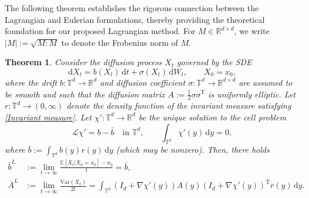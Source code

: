 \documentclass[12pt,a4paper,reqno]{amsart}
\newtheorem{theorem}{Theorem}[section]
\newcommand{\R}{\mathbb{R}}
\numberwithin{equation}{section}
\begin{document}
The following theorem establishes the rigorous connection between the Lagrangian and Eulerian formulations, thereby providing the theoretical foundation for our proposed Lagrangian method. For $M\in \R^{d\times d}$, we write $\lvert M \rvert := \sqrt{M:M}$ to denote the Frobenius norm of $M$.

 \begin{theorem}\label{Relation between Lagrangian and Eulerian frameworks}
 Consider the diffusion process $X_t$ governed by the SDE 
    \begin{equation}\label{target SDE}
        \mathrm{d}X_t = b(X_t)\,\mathrm{d}t + \sigma(X_t)\,\mathrm{d}W_t,\qquad X_0 = x_0,
\end{equation}
where the drift $b:\mathbb{T}^d\rightarrow \mathbb{R}^d$ and diffusion coefficient $\sigma:\mathbb{T}^d\rightarrow \mathbb{R}^{d \times d}$ are assumed to be smooth and such that the diffusion matrix $A := \frac{1}{2}\sigma\sigma^{\mathrm{T}}$ is uniformly elliptic. Let $r:\mathbb{T}^d\rightarrow (0,\infty)$ denote the density function of the invariant measure satisfying \eqref{Invariant measure}. Let $\chi' :\mathbb{T}^d \rightarrow \mathbb{R}^d$ be the unique solution to the cell problem
    \begin{equation}\label{chip eqn}
        \mathcal{L}\chi' = b - \bar{b}\quad\text{in }\mathbb{T}^d, \qquad \int_{\mathbb{T}^d}\chi'(y)\,\mathrm{d}y = 0,
    \end{equation}
    where $\bar{b}:=\int_{\mathbb{T}^d}b(y)r(y)\,\mathrm{d}y$ (which may be nonzero). Then, there holds
     \begin{align*}
 		\bar{b}^L &:=\lim_{t\to \infty}\frac{\mathbb{E}[X_t|X_0 = x_0]- x_0}{t}  = \bar{b},\\ \overline{A}^L &:= \lim_{t\to \infty}\frac{\mathrm{Var}(X_t)}{2t}  =\int_{\mathbb{T}^d} \left(I_d + \nabla \chi'(y)\right)A(y)\left(I_d+\nabla \chi'(y)\right)^{\mathrm{T}}r(y)\,\mathrm{d}y.
 \end{align*} 
\end{theorem}
\end{document}

